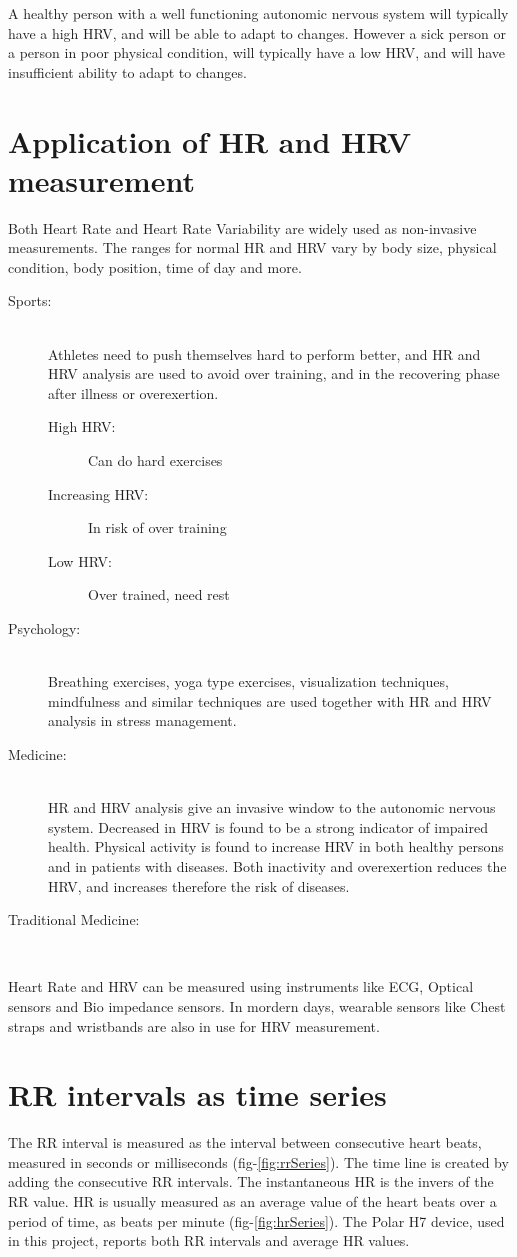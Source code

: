 \documentclass[a4paper, 11pt]{report}\usepackage[]{graphicx}\usepackage[]{color}
\numberwithin{figure}{section}
\begin{document}
A healthy person with a well functioning autonomic nervous system will typically have a high HRV, and will be able to adapt to changes. However a sick person or a person in poor physical condition, will typically have a low HRV, and will have insufficient ability to adapt to changes.

\section{Application of HR and HRV measurement}
Both Heart Rate and Heart Rate Variability are widely used as non-invasive measurements. The ranges for normal HR and HRV vary by body size, physical condition, body position, time of day and more.
\begin{description}
\item [Sports:] \hfill \\
Athletes need to push themselves hard to perform better, and HR and HRV analysis are used to avoid over training, and in the recovering phase after illness or overexertion. 
\begin{description}
\item [High HRV:] Can do hard exercises
\item [Increasing HRV:] In risk of over training
\item [Low HRV:] Over trained, need rest
\end{description}
\item [Psychology:]\hfill \\ 
Breathing exercises, yoga type exercises, visualization techniques, mindfulness and similar techniques are used together with HR and HRV analysis in stress management. 
\item [Medicine:]\hfill \\ 
HR and HRV analysis give an invasive window to the autonomic nervous system. Decreased in HRV is found to be a strong indicator of impaired health. Physical activity is found to increase HRV in both healthy persons and in patients with diseases. Both inactivity and overexertion reduces the HRV, and increases therefore the risk of diseases.
\item [Traditional Medicine:]\hfill \\ 
\end{description}
Heart Rate and HRV can be measured using instruments like ECG, Optical sensors and Bio impedance sensors. In mordern days, wearable sensors like Chest straps and wristbands are also in use for HRV measurement.

\section{RR intervals as time series}
The RR interval is measured as the interval between consecutive heart beats, measured in seconds or milliseconds (fig-\ref{fig:rrSeries}). The time line is created by adding the consecutive RR intervals. The instantaneous HR is the invers of the RR value. HR is usually measured as an average value of the heart beats over a period of time, as beats per minute (fig-\ref{fig:hrSeries}). The Polar H7 device, used in this project, reports both RR intervals and average HR values. 
\end{document}
